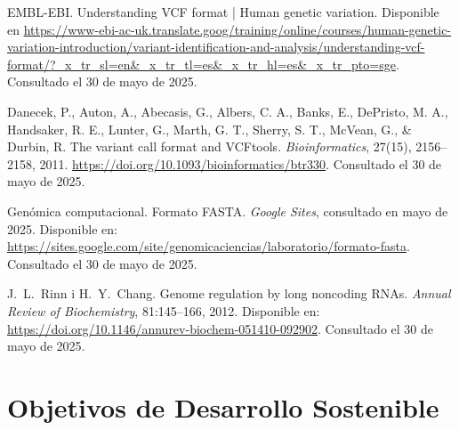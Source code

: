 \documentclass[11pt,spanish,listoffigures,listoftables]{tfgetsinf}
\begin{document}
\begin{thebibliography}{99}
   EMBL-EBI.  
   \newblock Understanding VCF format | Human genetic variation.  
   \newblock Disponible en 
   \newblock \url{https://www-ebi-ac-uk.translate.goog/training/online/courses/human-genetic-variation-introduction/variant-identification-and-analysis/understanding-vcf-format/?_x_tr_sl=en&_x_tr_tl=es&_x_tr_hl=es&_x_tr_pto=sge}.
   \newblock Consultado el 30 de mayo de 2025.
   
   Danecek, P., Auton, A., Abecasis, G., Albers, C. A., Banks, E., DePristo, M. A., Handsaker, R. E., Lunter, G., Marth, G. T., Sherry, S. T., McVean, G., \& Durbin, R.  
   \newblock The variant call format and VCFtools.  
   \newblock \textit{Bioinformatics}, 27(15), 2156–2158, 2011.  
   \newblock \url{https://doi.org/10.1093/bioinformatics/btr330}.
   \newblock Consultado el 30 de mayo de 2025.

   Genómica computacional.  
   \newblock Formato FASTA.  
   \newblock \textit{Google Sites}, consultado en mayo de 2025.  
   \newblock Disponible en: 
   \newblock \url{https://sites.google.com/site/genomicaciencias/laboratorio/formato-fasta}.
   \newblock Consultado el 30 de mayo de 2025.

   J.~L.~Rinn i H.~Y.~Chang.
   \newblock Genome regulation by long noncoding RNAs.
   \newblock \textit{Annual Review of Biochemistry}, 81:145--166, 2012.
   \newblock Disponible en:
   \newblock \url{https://doi.org/10.1146/annurev-biochem-051410-092902}.
   \newblock Consultado el 30 de mayo de 2025.


   

\end{thebibliography}
\cleardoublepage


\APPENDIX


\chapter{Objetivos de Desarrollo Sostenible}
\end{document}
